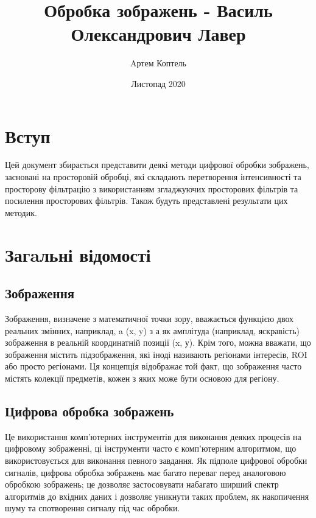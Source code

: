 \documentclass{article}
\title{Обробка зображень - Василь Олександрович Лавер}
\author{Aртем Коптель }
\date{Листопад 2020}
\begin{document}
    \maketitle
    \newpage

    \tableofcontents
    \newpage


    \section{Вступ}\label{sec:intro}

    Цей документ збирається представити деякі методи цифрової обробки зображень, засновані на просторовій обробці,
    які складають перетворення інтенсивності та просторову фільтрацію з використанням згладжуючих просторових фільтрів
    та посилення просторових фільтрів.
    Також будуть представлені результати цих методик.
    \newpage


    \section{Загaльні відомості}\label{sec:general}

    \subsection{Зображення}\label{subsec:image}
    Зображення, визначене з математичної точки зору, вважається функцією двох реальних змінних, наприклад,
    a (x, y) з а як амплітуда (наприклад, яскравість) зображення в реальній координатній позиції (x, у).
    Крім того, можна вважати, що зображення містить підзображення, які іноді називають регіонами інтересів,
    ROI або просто регіонами.
    Ця концепція відображає той факт, що зображення часто містять колекції предметів, кожен з яких може бути основою для регіону.

    \subsection{Цифрова обробка зображень}\label{subsec:image_preprocessing}
    Це використання комп’ютерних інструментів для виконання деяких процесів на цифровому зображенні, ці інструменти часто
    є комп’ютерним алгоритмом, що використовується для виконання певного завдання.
    Як підполе цифрової обробки сигналів, цифрова обробка зображень має багато переваг перед аналоговою обробкою зображень;
    це дозволяє застосовувати набагато ширший спектр алгоритмів до вхідних даних і дозволяє уникнути таких проблем,
    як накопичення шуму та спотворення сигналу під час обробки.
\end{document}

